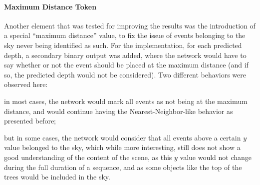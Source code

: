 \paragraph{Maximum Distance Token}
Another element that was tested for improving the results was the introduction of a special ``maximum distance'' value, to fix the issue of events belonging to the sky never being identified as such. For the implementation, for each predicted depth, a secondary binary output was added, where the network would have to say whether or not the event should be placed at the maximum distance (and if so, the predicted depth would not be considered). Two different behaviors were observed here:
\begin{enumerate*}[label=\textbf{(\arabic*)}]
  \item in most cases, the network would mark all events as not being at the maximum distance, and would continue having the Nearest-Neighbor-like behavior as presented before;
  \item but in some cases, the network would consider that all events above a certain \(y\) value belonged to the sky, which while more interesting, still does not show a good understanding of the content of the scene, as this \(y\) value would not change during the full duration of a sequence, and as some objects like the top of the trees would be included in the sky. 
\end{enumerate*}

